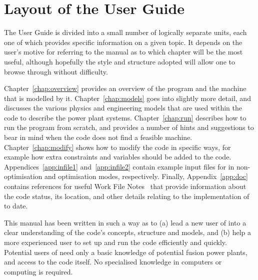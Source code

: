 \section{Layout of the User Guide}

The User Guide is divided into a small number of logically separate units,
each one of which provides specific information on a given topic. It depends
on the user's motive for referring to the manual as to which chapter will be
the most useful, although hopefully the style and structure adopted will allow
one to browse through without difficulty.

Chapter~\ref{chap:overview} provides an overview of the program and the
machine that is modelled by it. Chapter~\ref{chap:models} goes into slightly
more detail, and discusses the various physics and engineering models that are
used within the code to describe the power plant systems.
Chapter~\ref{chap:run} describes how to run the program from scratch, and
provides a number of hints and suggestions to bear in mind when the code does
not find a feasible machine. Chapter~\ref{chap:modify} shows how to modify the
code in specific ways, for example how extra constraints and variables should
be added to the code. Appendices~\ref{app:infile1} and~\ref{app:infile2}
contain example input files for \PS in non-optimisation and optimisation
modes, respectively. Finally, Appendix~\ref{app:doc} contains references for
useful Work File Notes~\cite{PWF} that provide information about the code
status, its location, and other details relating to the implementation of \PS
to date.

This manual has been written in such a way as to (a) lead a new user of \PS
into a clear understanding of the code's concepts, structure and models, and
(b) help a more experienced user to set up and run the code efficiently and
quickly. Potential users of \PS need only a basic knowledge of potential
fusion power plants, and access to the code itself. No specialised knowledge
in computers or computing is required.

